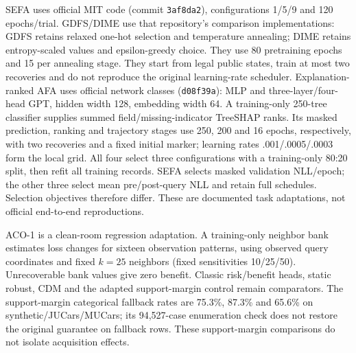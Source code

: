 \documentclass[11pt]{article}
\begin{document}
SEFA uses official MIT code (commit \texttt{3af8da2}), configurations 1/5/9
and 120 epochs/trial. GDFS/DIME use that repository's comparison
implementations: GDFS retains relaxed one-hot selection and temperature
annealing; DIME retains entropy-scaled values and epsilon-greedy choice.
They use 80 pretraining epochs and 15 per annealing stage. They start from legal public states, train at most two
recoveries and do not reproduce the original learning-rate scheduler.
Explanation-ranked AFA uses official network classes (\texttt{d08f39a}):
MLP and three-layer/four-head GPT, hidden width 128, embedding width 64.
A training-only 250-tree classifier supplies summed field/missing-indicator
TreeSHAP ranks. Its masked prediction, ranking and trajectory stages use 250, 200 and 16
epochs, respectively, with two recoveries and a fixed initial marker;
learning rates .001/.0005/.0003 form the local grid. All four select three
configurations with a training-only 80:20 split, then refit all training
records. SEFA selects masked validation NLL/epoch; the other three select
mean pre/post-query NLL and retain full schedules. Selection objectives
therefore differ. These are documented task adaptations, not official
end-to-end reproductions.

ACO-1 is a clean-room regression adaptation. A training-only neighbor bank
estimates loss changes for sixteen observation patterns, using observed query
coordinates and fixed $k=25$ neighbors (fixed sensitivities 10/25/50).
Unrecoverable bank values give zero benefit. Classic risk/benefit heads,
static robust, CDM and the adapted support-margin control remain comparators.
The support-margin categorical fallback rates are 75.3\%, 87.3\% and 65.6\%
on synthetic/JUCars/MUCars; its 94,527-case enumeration check does not restore
the original guarantee on fallback rows. These support-margin comparisons do not isolate acquisition effects.
\end{document}
